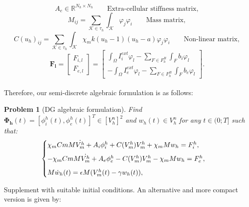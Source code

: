 \documentclass[a4paper,11pt]{article}
\newtheorem{problem}{Problem}
\begin{document}
\begin{equation*}
A_e \in \mathbb{R}^{N_h \times N_h} \qquad{\text{Extra-cellular stiffness matrix}},
\end{equation*}
\begin{equation*}
M_{ij} = \sum_{\mathcal{K} \in \tau_h}\int_{\mathcal{K}}\varphi_j\varphi_i \qquad{\text{Mass matrix}},
\end{equation*}
\begin{equation*}
C(u_h)_{ij} =  \sum_{\mathcal{K} \in \tau_h} \int_{\mathcal{K}} \chi_m k(u_h-1)(u_h-a)\varphi_j\varphi_i \qquad{\text{Non-linear matrix}},
\end{equation*}
\begin{equation*}
\bm{F_l}=\begin{bmatrix} F_{i,l} \\ F_{e,l} \end{bmatrix}=\begin{bmatrix} \int_{\Omega} I_i^{ext}\varphi_l - \sum_{F \in F_h^B} \int_F b_i\varphi_l \\ - \int_{\Omega} I_e^{ext}\varphi_l - \sum_{F \in F_h^B} \int_F b_e\varphi_l \end{bmatrix}.
\end{equation*}
\vspace{3mm} \\
Therefore, our semi-discrete algebraic formulation is as follows: \vspace{3mm}
\begin{problem}[DG algebraic formulation]\label{algebraic}
Find $\bm{\Phi_h}(t)=[\phi_i^h(t),\phi_e^h(t)]^T \in [V_h^n]^2$ and $w_h(t) \in V_h^n$ for any $t \in (0;T]$ such that:
\begin{equation*}
\begin{cases}
\chi_m Cm M \dot{V_m^h}+A_i \phi_i^h+C(V_m^h) V_m^h+\chi_m M w_h=F_i^h, \vspace{2mm} \\ 
-\chi_m Cm M \dot{V_m^h}+A_e \phi_e^h-C(V_m^h) V_m^h-\chi_m M w_h=F_e^h, \vspace{2mm} \\ 
M \dot{w}_h(t)=\epsilon M (V_m^h(t)-\gamma w_h(t)),
\end{cases}
\end{equation*}
\end{problem}
 \vspace{5mm}
 Supplement with suitable initial conditions.
 \noindent An alternative and more compact version is given by: \vspace{3mm}
\end{document}
